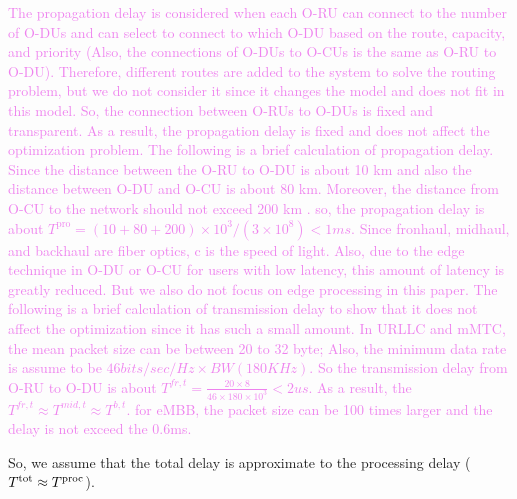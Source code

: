 \documentclass[lettersize,journal]{IEEEtran}
\begin{document}
\textcolor{Violet}{The propagation delay is considered when each O-RU can connect to the number of O-DUs and can select to connect to which O-DU based on the route, capacity, and priority (Also, the connections of O-DUs to O-CUs is the same as O-RU to O-DU). Therefore, different routes are added to the system to solve the routing problem, but we do not consider it since it changes the model and does not fit in this model. So, the connection between O-RUs to O-DUs is fixed and transparent. As a result, the propagation delay is fixed and does not affect the optimization problem.
The following is a brief calculation of propagation delay.
Since the distance between the O-RU to O-DU is about 10 km and also the distance between O-DU and O-CU is about 80 km. Moreover, the distance from O-CU to the network should not exceed 200 km \cite{oranD1}. so, the propagation delay is about $T^{\text{pro}} = (10 + 80 + 200)\times 10^3 /(3\times 10^8) < 1ms $. Since fronhaul, midhaul, and backhaul are fiber optics, c is the speed of light. Also, due to the edge technique in O-DU or O-CU for users with low latency, this amount of latency is greatly reduced. But we also do not focus on edge processing in this paper.
The following is a brief calculation of transmission delay to show that it does not affect the optimization since it has such a small amount.
In URLLC and mMTC, the mean packet size can be between 20 to 32 byte; Also, the minimum data rate is assume to be $46 bits/sec/Hz \times BW (180 KHz)$. So the transmission delay from O-RU to O-DU is about $T^{fr,t} = \frac{20\times 8}{46 \times 180 \times 10^3} < 2 us$. As a result, the $T^{fr,t} \approx T^{mid,t} \approx T^{b,t}$. for eMBB, the packet size can be 100 times larger and the delay is not exceed the 0.6ms.  
}

So, we assume that the total delay is approximate to the processing delay ($T^{\text{\text{tot}}} \approx T^{\text{proc}}$). 
\end{document}
